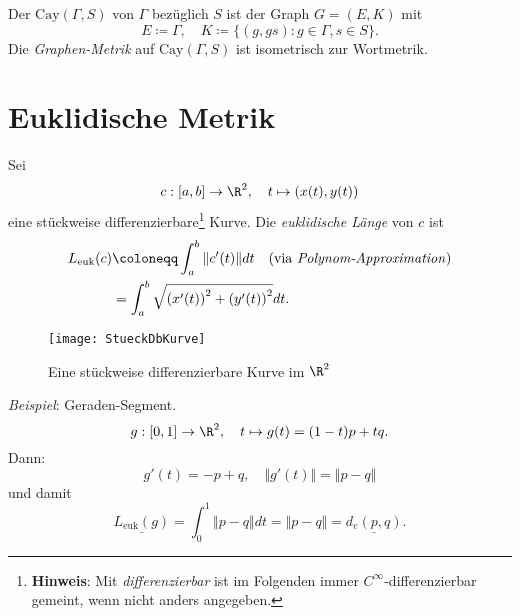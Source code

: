 \begin{definition}
  Der  \( \text{Cay}(\Gamma, S) \) von \( \Gamma \) bezüglich \( S \) ist der Graph \( G = (E, K) \) mit
  \begin{equation*}
    E \coloneqq \Gamma, \quad K \coloneqq \{ (g, gs) : g \in \Gamma, s \in S \}\text{.}
  \end{equation*}
  Die \emph{Graphen-Metrik} auf \( \text{Cay}(\Gamma, S) \) ist isometrisch zur Wortmetrik.
\end{definition}

\section{Euklidische Metrik}
\begin{example}
  Sei
  \begin{equation*}
    c : [a,b] \to \R^2, \quad t \mapsto (x(t), y(t))
  \end{equation*}
  eine stückweise differenzierbare\footnote{\textbf{Hinweis}: Mit \emph{differenzierbar} ist im Folgenden immer \( C^\infty \)-differenzierbar gemeint, wenn nicht anders angegeben.} Kurve.
  Die \emph{euklidische Länge} von \( c \) ist
  \begin{align*}
    L_{\text{euk}}(c) &\coloneqq \int_a^b \Vert c'(t) \Vert dt \quad \text{(via \emph{Polynom-Approximation})} \\
     &= \int_a^b \sqrt{{\left( x'(t) \right)}^2 + {\left( y'(t) \right)}^2}dt\text{.}
  \end{align*}
  \begin{figure}[H]
    \texttt{[image: StueckDbKurve]}
    \caption{Eine stückweise differenzierbare Kurve im \( \R^2 \)}
  \end{figure}
  \emph{Beispiel}: Geraden-Segment.
  \begin{equation*}
    g: [0,1] \to \R^2, \quad t \mapsto g(t) = (1-t)p + tq\text{.}
  \end{equation*}
  Dann:
  \begin{equation*}
    g'(t) = -p+q, \quad \Vert g'(t) \Vert = \Vert p - q \Vert
  \end{equation*}
  und damit
  \begin{equation*}
    \underline{L_{\text{euk}}(g)} = \int_0^1\Vert p - q \Vert dt = \Vert p - q \Vert = \underline{d_e(p,q)}\text{.}
  \end{equation*}
\end{example}

